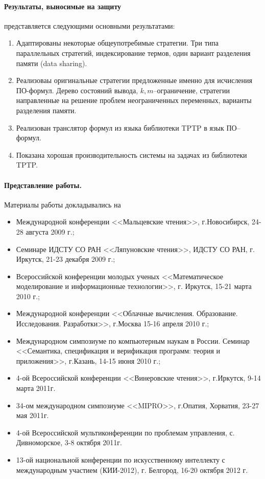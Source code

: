 \paragraph{Результаты, выносимые на защиту}\hspace{-1em} представляется следующими основными результатами:
\begin{enumerate}
\item Адаптированы некоторые общеупотребимые стратегии. Три типа параллельных стратегий, индексирование термов, один вариант разделения памяти (data sharing).
\item Реализоваы оригинальные стратегии предложенные именно для исчисления ПО-формул. Дерево состояний вывода, $k,m$--ограничение, стратегии направленные на решение проблем неограниченных переменных, варианты разделения памяти.
\item Реализован транслятор формул из языка библиотеки TPTP в язык ПО--формул.
\item Показана хорошая производительность системы на задачах из библиотеки TPTP.
\end{enumerate}





\paragraph{Представление работы.} Материалы работы докладывались на
\begin{itemize}
\item Международной конференции <<Мальцевские чтения>>, г.Новосибирск, 24-28 августа 2009 г.;
\item Семинаре ИДСТУ СО РАН <<Ляпуновские чтения>>, ИДСТУ СО РАН, г. Иркутск, 21-23 декабря 2009 г.;
\item Всероссийской конференции молодых ученых <<Математическое моделирование и информационные технологии>>, г. Иркутск, 15-21 марта 2010 г.;
\item Международной конференции <<Облачные вычисления. Образование. Исследования. Разработки>>, г.Москва 15-16 апреля 2010 г.;
\item Международном симпозиуме по компьютерным наукам в России. Семинар <<Семантика, спецификация и верификация программ: теория и приложения>>, г.Казань, 14-15 июня 2010 г.;
\item 4-ой Всероссийской конференции <<Винеровские чтения>>, г.Иркутск, 9-14 марта 2011г.
\item 34-ом международном симпозиуме <<MIPRO>>, г.Опатия, Хорватия, 23-27 мая 2011г.
\item 4-ой Всероссийской мультиконференции по проблемам управления, с. Дивноморское, 3-8 октября 2011г.
\item 13-ой национальной конференции по искусственному интеллекту с международным участием (КИИ-2012), г. Белгород, 16-20 октября 2012 г.
\end{itemize}

